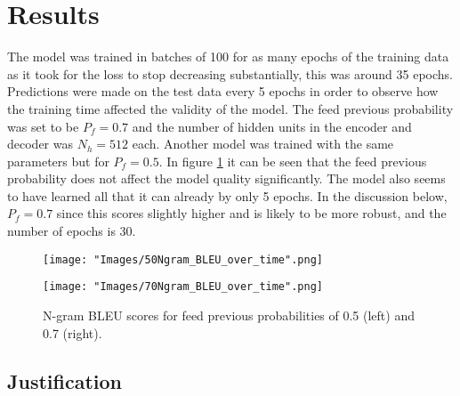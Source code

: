 \documentclass[]{article}
\begin{document}
\section{Results}
The model was trained in batches of 100 for as many epochs of the training data as it took for the loss to stop decreasing substantially, this was around 35 epochs. Predictions were made on the test data every 5 epochs in order to observe how the training time affected the validity of the model. The feed previous probability was set to be $P_f=0.7$ and the number of hidden units in the encoder and decoder was $N_h=512$ each. Another model was trained with the same parameters but for $P_f=0.5$. In figure \ref{fig:over_time} it can be seen that the feed previous probability does not affect the model quality significantly. The model also seems to have learned all that it can already by only 5 epochs. In the discussion below, $P_f=0.7$ since this scores slightly higher and is likely to be more robust, and the number of epochs is 30.

\begin{figure}[h]
	\centering
	\begin{minipage}[b]{0.48\textwidth}
		\texttt{[image: "Images/50Ngram\_BLEU\_over\_time".png]}
	\end{minipage}
	\begin{minipage}[b]{0.48\textwidth}
		\texttt{[image: "Images/70Ngram\_BLEU\_over\_time".png]}
	\end{minipage}
	\caption{N-gram BLEU scores for feed previous probabilities of 0.5 (left) and 0.7 (right). }
	\label{fig:over_time}
\end{figure}

\subsection{Justification}
\end{document}
